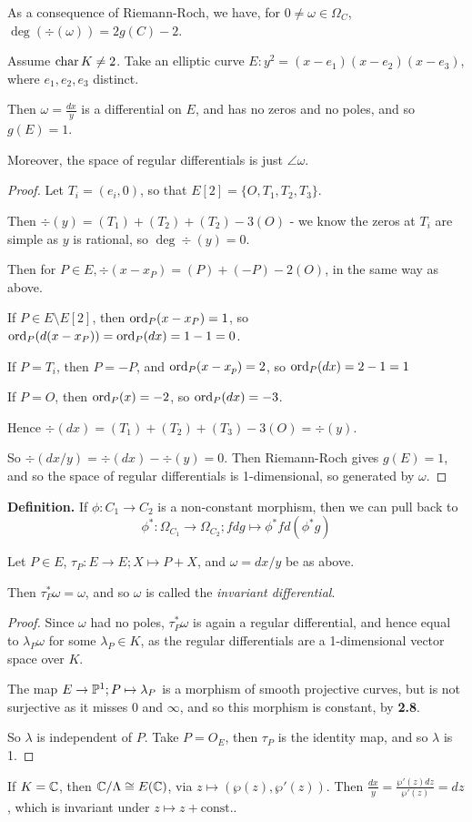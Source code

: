 \documentclass[10pt,a4paper]{article}
\begin{document}
As a consequence of Riemann-Roch, we have, for $0 \neq \omega \in \Omega_C$, $\deg(\div(\omega)) = 2g(C)-2$.

\begin{lemma}
  Assume $\charr K \neq 2$. Take an elliptic curve $E:y^2=(x-e_1)(x-e_2)(x-e_3)$, where $e_1, e_2, e_3$ distinct.

  Then $\omega = \frac{dx}{y}$ is a differential on $E$, and has no zeros and no poles, and so $g(E)=1$.

  Moreover, the space of regular differentials is just $\angle{\omega}$.
\end{lemma}
\begin{proof}
  Let $T_i = (e_i, 0)$, so that $E[2] = \{O, T_1, T_2, T_3\}$.

  Then $\div(y) = (T_1)+(T_2)+(T_2)-3(O)$ - we know the zeros at $T_i$ are simple as $y$ is rational, so $\deg \div(y) = 0$.

  Then for $P \in E, \div(x-x_P) = (P) + (-P) - 2(O)$, in the same way as above.

  If $P \in E\setminus E[2]$, then $\ord_P(x-x_P) = 1$, so $\ord_P(d(x-x_P)) = \ord_P(dx) = 1-1= 0$.

  If $P = T_i$, then $P = -P$, and $\ord_P(x-x_p) = 2$, so $\ord_P(dx) = 2-1 = 1$

  If $P = O$, then $\ord_P(x) = -2$, so $\ord_P(dx) = -3$.

  Hence $\div(dx) = (T_1)+(T_2)+(T_3)-3(O) = \div(y)$.

  So $\div(dx/y) = \div(dx)-\div(y) = 0$. Then Riemann-Roch gives $g(E) = 1$, and so the space of regular differentials is 1-dimensional, so generated by $\omega$.
\end{proof}
\textbf{Definition.} If $\phi:C_1 \to C_2$ is a non-constant morphism, then we can pull back to \[\phi^\ast:\Omega_{C_1}\to \Omega_{C_2}; fdg \mapsto \phi^\ast f d(\phi^\ast g)\]

\begin{lemma}
  Let $P \in E$, $\tau_P:E \to E; X \mapsto P+X$, and $\omega = dx/y$ be as above.

  Then $\tau_P^\ast \omega = \omega$, and so $\omega$ is called the \emph{invariant differential}.
\end{lemma}
\begin{proof}
  Since $\omega$ had no poles, $\tau_P^\ast \omega$ is again a regular differential, and hence equal to $\lambda_P \omega$ for some $\lambda_P \in K$, as the regular differentials are a 1-dimensional vector space over $K$.

  The map $E \to \P^1; P \mapsto \lambda_P$ is a morphism of smooth projective curves, but is not surjective as it misses $0$ and $\infty$, and so this morphism is constant, by \textbf{2.8}.

  So $\lambda$ is independent of $P$. Take $P = O_E$, then $\tau_P$ is the identity map, and so $\lambda$ is 1.
\end{proof}
If $K = \C$, then $\C/\Lambda \cong E(\C)$, via $z \mapsto (\wp(z), \wp'(z))$. Then $\frac{dx}{y}=\frac{\wp'(z)dz}{\wp'(z)} = dz$, which is invariant under $z \mapsto z+\text{const.}$.
\end{document}
